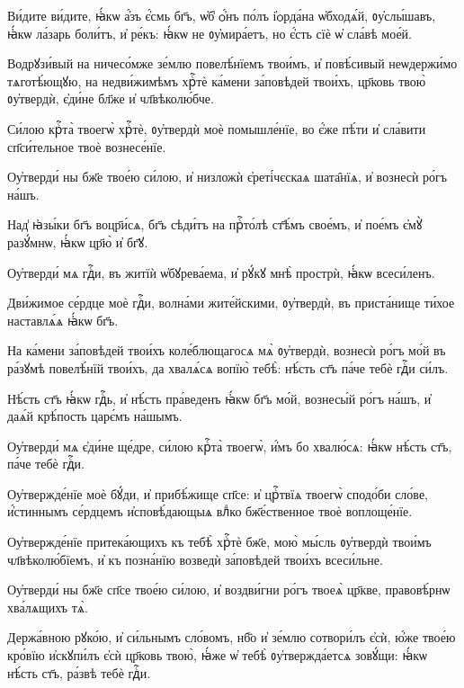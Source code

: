 \hKv Ви́дите ви́дите, ꙗ҆́кѡ а҆́зъ є҆́смь бг҃ъ, ѡ҆б̾ ѻ҆́нъ  по́лъ і҆ѻрда́на ѡ҆бходѧ́й, ᲂу҆слы́шавъ, ꙗ҆́кѡ  ла́зарь боли́тъ, и҆ ре́къ: ꙗ҆́кѡ не  ᲂу҆мира́етъ, но є҆́сть сїѐ ѡ҆ сла́вѣ мое́й. 
%

\hKv Водрꙋзи́вый на ничесо́мже зе́млю повелѣ́нїемъ твои́мъ, и҆  повѣ́сивый неѡдержи́мо тѧготѣ́ющꙋю, на недви́жимѣмъ  хрⷭ҇тѐ ка́мени за́повѣдей твои́хъ, цр҃ковь твою̀  ᲂу҆твердѝ, є҆ди́не бл҃же и҆ чл҃вѣколю́бче. 
%

\hKv Си́лою крⷭ҇та̀ твоегѡ̀ хрⷭ҇тѐ, ᲂу҆твердѝ  моѐ помышле́нїе, во є҆́же пѣ́ти и҆ сла́вити сп҃си́тельное  твоѐ вознесе́нїе. 
%

\hKv Оу҆тверди́ ны бж҃е твое́ю си́лою, и҆ низложѝ  є҆реті́чєскаѧ шата̑нїѧ, и҆ вознесѝ ро́гъ на́шъ. 

\hKv Над̾ ꙗ҆зы́ки бг҃ъ воцр҃и́сѧ, бг҃ъ сѣди́тъ на прⷭ҇то́лѣ  ст҃ѣ́мъ свое́мъ, и҆ пое́мъ є҆мꙋ̀ разꙋ́мнѡ, ꙗ҆́кѡ цр҃ю̀ и҆  бг҃ꙋ. 

\hKv Оу҆тверди́ мѧ гдⷭ҇и, въ житїѝ ѡ҆бꙋрева́ема, и҆ рꙋ́кꙋ мнѣ̀  прострѝ, ꙗ҆́кѡ всеси́ленъ.  

\hKv Дви́жимое се́рдце моѐ гдⷭ҇и, волна́ми жите́йскими,  ᲂу҆твердѝ, въ приста́нище ти́хое наставлѧ́ѧ ꙗ҆́кѡ бг҃ъ. 

\hKv На ка́мени за́повѣдей твои́хъ коле́блющагосѧ мѧ̀  ᲂу҆твердѝ, вознесѝ ро́гъ мо́й въ ра́зꙋмѣ повелѣ́нїй  твои́хъ, да хвалѧ́сѧ вопїю̀ тебѣ̀: нѣ́сть ст҃ъ па́че тебѐ  гдⷭ҇и си́лъ. 

\hKv Нѣ́сть ст҃ъ ꙗ҆́кѡ гдⷭ҇ь, и҆ нѣ́сть пра́веденъ ꙗ҆́кѡ бг҃ъ  мо́й, вознесы́й ро́гъ на́шъ, и҆ даѧ́й крѣ́пость царє́мъ  на́шымъ. 

\hKv Оу҆тверди́ мѧ є҆ди́не ще́дре, си́лою крⷭ҇та̀ твоегѡ̀,  и҆́мъ бо хвалю́сѧ: ꙗ҆́кѡ нѣ́сть ст҃ъ, па́че тебѐ гдⷭ҇и. 

\hKv Оу҆твержде́нїе моѐ бꙋ́ди, и҆ прибѣ́жище сп҃се: и҆  црⷭ҇твїѧ твоегѡ̀ сподо́би сло́ве, и҆́стиннымъ се́рдцемъ  и҆сповѣ́дающыѧ влⷣко бж҃е́ственное твоѐ воплоще́нїе. 

\hKv Оу҆твержде́нїе притека́ющихъ къ тебѣ̀ хрⷭ҇тѐ бж҃е, мою̀  мы́сль ᲂу҆твердѝ твои́мъ чл҃вѣколю́бїемъ, и҆ къ позна́нїю  возведѝ за́повѣдей твои́хъ всеси́льне.  

\hKv Оу҆тверди́ ны бж҃е сп҃се твое́ю си́лою, и҆ воздви́гни ро́гъ  твоеѧ̀ цр҃кве, правовѣ́рнѡ хва́лѧщихъ тѧ̀. 

\hKv Держа́вною рꙋко́ю, и҆ си́льнымъ сло́вомъ, нб҃о и҆ зе́млю  сотвори́лъ є҆сѝ, ю҆́же твое́ю кро́вїю и҆скꙋпи́лъ є҆сѝ  цр҃ковь твою̀, ꙗ҆́же ѡ҆ тебѣ̀ ᲂу҆твержда́етсѧ зовꙋ́щи:  ꙗ҆́кѡ нѣ́сть ст҃ъ, ра́звѣ тебѐ гдⷭ҇и. 
%

